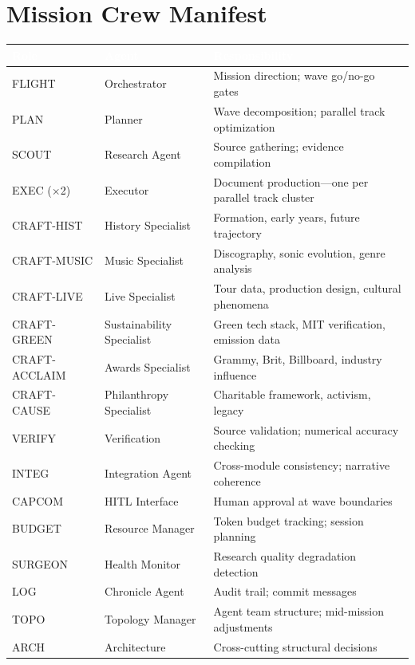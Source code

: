 \documentclass[11pt,letterpaper]{article}
\newcommand{\tableheader}[1]{\textbf{\sffamily\textcolor{white}{#1}}}
\begin{document}
\section{Mission Crew Manifest}

\begin{center}
\begin{tabularx}{\textwidth}{L{2.5cm}L{2.5cm}X}
\toprule
{}
\tableheader{Role} & \tableheader{Agent} & \tableheader{Responsibility} \\
\midrule
FLIGHT & Orchestrator & Mission direction; wave go/no-go gates \\
PLAN & Planner & Wave decomposition; parallel track optimization \\
SCOUT & Research Agent & Source gathering; evidence compilation \\
EXEC (×2) & Executor & Document production---one per parallel track cluster \\
CRAFT-HIST & History Specialist & Formation, early years, future trajectory \\
CRAFT-MUSIC & Music Specialist & Discography, sonic evolution, genre analysis \\
CRAFT-LIVE & Live Specialist & Tour data, production design, cultural phenomena \\
CRAFT-GREEN & Sustainability Specialist & Green tech stack, MIT verification, emission data \\
CRAFT-ACCLAIM & Awards Specialist & Grammy, Brit, Billboard, industry influence \\
CRAFT-CAUSE & Philanthropy Specialist & Charitable framework, activism, legacy \\
VERIFY & Verification & Source validation; numerical accuracy checking \\
INTEG & Integration Agent & Cross-module consistency; narrative coherence \\
CAPCOM & HITL Interface & Human approval at wave boundaries \\
BUDGET & Resource Manager & Token budget tracking; session planning \\
SURGEON & Health Monitor & Research quality degradation detection \\
LOG & Chronicle Agent & Audit trail; commit messages \\
TOPO & Topology Manager & Agent team structure; mid-mission adjustments \\
ARCH & Architecture & Cross-cutting structural decisions \\
\bottomrule
\end{tabularx}
\end{center}
\end{document}
